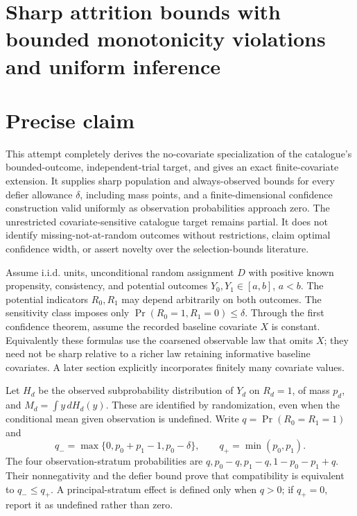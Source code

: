 \documentclass[11pt,a4paper]{article}
\begin{document}
\section*{Sharp attrition bounds with bounded monotonicity violations and uniform inference}
\section{Precise claim}
This attempt completely derives the no-covariate specialization of the catalogue's bounded-outcome, independent-trial target, and gives an exact finite-covariate extension. It supplies sharp population and always-observed bounds for every defier allowance $\delta$, including mass points, and a finite-dimensional confidence construction valid uniformly as observation probabilities approach zero. The unrestricted covariate-sensitive catalogue target remains partial. It does not identify missing-not-at-random outcomes without restrictions, claim optimal confidence width, or assert novelty over the selection-bounds literature.

Assume i.i.d. units, unconditional random assignment $D$ with positive known propensity, consistency, and potential outcomes $Y_0,Y_1\in[a,b]$, $a<b$. The potential indicators $R_0,R_1$ may depend arbitrarily on both outcomes. The sensitivity class imposes only
$\Pr(R_0=1,R_1=0)\le\delta$. Through the first confidence theorem, assume the recorded baseline covariate $X$ is constant. Equivalently these formulas use the coarsened observable law that omits $X$; they need not be sharp relative to a richer law retaining informative baseline covariates. A later section explicitly incorporates finitely many covariate values.

Let $H_d$ be the observed subprobability distribution of $Y_d$ on $R_d=1$, of mass $p_d$, and $M_d=\int y\,dH_d(y)$. These are identified by randomization, even when the conditional mean given observation is undefined. Write $q=\Pr(R_0=R_1=1)$ and
\[
 q_- =\max\{0,p_0+p_1-1,p_0-\delta\},\qquad
 q_+=\min(p_0,p_1).                                      \tag{1}
\]
The four observation-stratum probabilities are $q,p_0-q,p_1-q,1-p_0-p_1+q$. Their nonnegativity and the defier bound prove that compatibility is equivalent to $q_-\le q_+$. A principal-stratum effect is defined only when $q>0$; if $q_+=0$, report it as undefined rather than zero.
\end{document}

